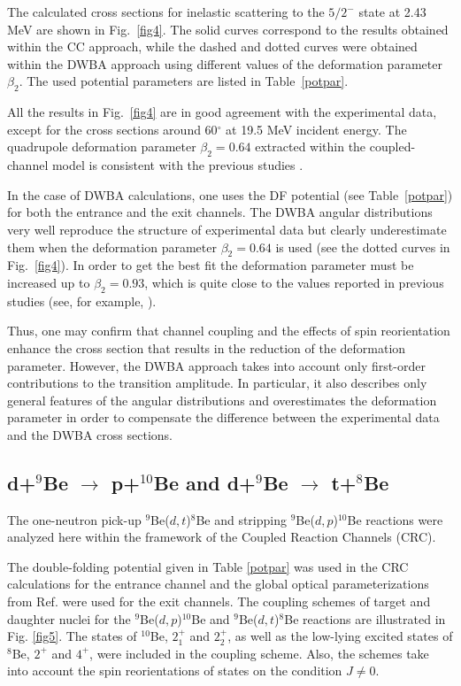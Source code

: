 \documentclass[
12pt, %
oneside, %
english, %
onehalfspacing, %
headsepline, %
]{MastersDoctoralThesis} %
\begin{document}
The calculated cross sections for inelastic scattering to the $5/2^-$ state at 2.43 MeV are shown in Fig.~\ref{fig4}. The solid curves correspond to the results obtained within the CC approach, while the dashed and dotted curves were obtained within the DWBA approach using  different values of the deformation parameter $\beta_2$. The used potential parameters are listed in Table~\ref{potpar}.

All the results in Fig.~\ref{fig4} are in good agreement with the experimental data, except for the cross sections around 60$^\circ$ at 19.5 MeV incident energy. The quadrupole deformation parameter $\beta_2 = 0.64$ extracted within the coupled-channel model is consistent with the previous studies \cite{lukyanov2014, harakeh1980}.

In the case of DWBA calculations, one uses the DF potential (see Table~\ref{potpar}) for both the entrance and the exit channels. The DWBA angular distributions very well reproduce the structure of experimental data but clearly underestimate them when the deformation parameter $\beta_2 = 0.64$ is used (see the dotted curves in Fig.~\ref{fig4}). In order to get the best fit the deformation parameter must be increased up to $\beta_2 = 0.93$, which is quite close to the values reported in previous studies (see, for example, \cite{bodek1989, votava1973}).


Thus, one may confirm that channel coupling and the effects of spin reorientation enhance the cross section that results in the reduction of the deformation parameter. However, the DWBA approach takes into account only first-order contributions to the transition amplitude. In particular, it also describes only general features of the angular distributions and overestimates the deformation parameter in order to compensate the difference between the experimental data and the DWBA cross sections.

\subsection{d+$^9$Be $\rightarrow$ p+$^{10}$Be and d+$^9$Be $\rightarrow$ t+$^{8}$Be}

The one-neutron pick-up ${}^9$Be($d,t$)${}^8$Be and stripping ${}^9$Be($d,p$)${}^{10}$Be reactions were analyzed here within the framework of  the Coupled Reaction Channels (CRC).

The double-folding potential given in Table \ref{potpar} was used in the CRC calculations for the entrance channel and the global optical parameterizations from Ref. \cite{globalProton, globalTriton} were used for the exit channels. The coupling schemes of target and daughter nuclei for the ${}^9$Be($d,p$)${}^{10}$Be and ${}^9$Be($d,t$)${}^8$Be  reactions  are illustrated in Fig. \ref{fig5}. The states of ${}^{10}$Be, $2^+_{1}$ and $2^+_{2}$, as well as the low-lying excited states of ${}^8$Be, $2^+$ and $4^+$, were included in the coupling scheme. Also, the schemes take into account the spin reorientations of states on the condition $J \neq 0$.
\end{document}
